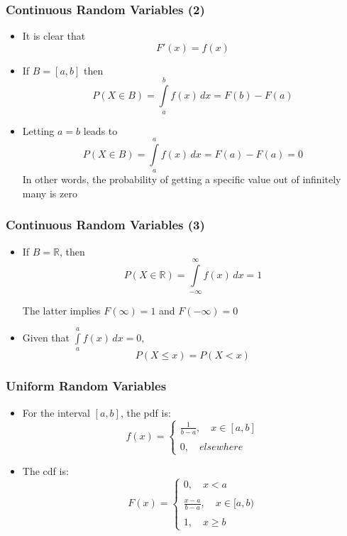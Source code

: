 \documentclass[10pt]{beamer}
\theoremstyle{definition}
\begin{document}
\begin{frame}[fragile]
\frametitle{Continuous Random Variables (2)}
\begin{itemize}
	\item It is clear that
	\[
		F'(x) = f(x)
	\]
		
	\item If $ B = [a, b] $ then
	\[
		P(X \in B) = \int\limits_{a}^{b} f(x) \, dx = F(b) - F(a)
	\]
		
	\item Letting $ a = b $ leads to
	\[
		P(X \in B) = \int\limits_{a}^{a} f(x) \, dx = F(a) - F(a) = 0
	\]
	In other words, the probability of getting a specific value out of infinitely many is zero
\end{itemize}
\end{frame}

\begin{frame}[fragile]
\frametitle{Continuous Random Variables (3)}
\begin{itemize}
	\item If $ B = \mathbb{R} $, then
	\[
		P(X \in \mathbb{R}) = \int\limits_{-\infty}^{\infty} f(x) \, dx = 1
	\]
		
	The latter implies $ F(\infty)  = 1$ and $ F(-\infty) = 0 $
		
	\item Given that $ \displaystyle\int\limits_{a}^{a} f(x) \, dx = 0 $,
	\[
		P(X \leq x) = P(X < x)
	\]
\end{itemize}
\end{frame}

\begin{frame}[fragile]
\frametitle{Uniform Random Variables}
\begin{itemize}
	\item For the interval $ [a, b] $, the pdf is:
	\[
		f(x) = 
		\left\{
		\begin{array}{l}
			\displaystyle\frac{1}{b-a}, \quad x \in [a,b]\\
			\quad\\
			0,\quad elsewhere
		\end{array}
		\right.
	\]
	
	\item The cdf is:
	\[
		F(x) = 
		\left\{
		\begin{array}{l}
			0,\quad x < a\\
			\quad\\
			\displaystyle\frac{x-a}{b-a}, \quad x \in [a,b)\\
			\quad\\
			1,\quad x \geq b
		\end{array}
		\right.
	\]
\end{itemize}
\end{frame}
\end{document}
